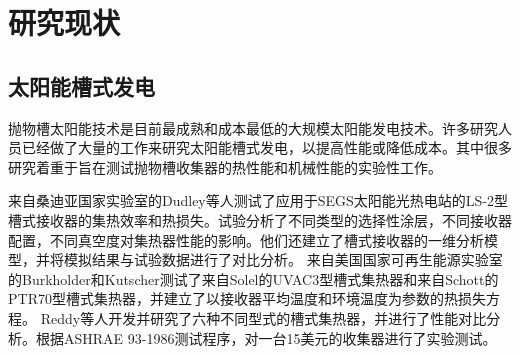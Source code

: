 \section{研究现状}

\subsection{太阳能槽式发电}

抛物槽太阳能技术是目前最成熟和成本最低的大规模太阳能发电技术\cite{Price2002}。许多研究人员已经做了大量的工作来研究太阳能槽式发电，以提高性能或降低成本。其中很多研究着重于旨在测试抛物槽收集器的热性能和机械性能的实验性工作。

来自桑迪亚国家实验室的Dudley等人\cite{Dudley1994}测试了应用于SEGS太阳能光热电站的LS-2型槽式接收器的集热效率和热损失。试验分析了不同类型的选择性涂层，不同接收器配置，不同真空度对集热器性能的影响。他们还建立了槽式接收器的一维分析模型，并将模拟结果与试验数据进行了对比分析。
来自美国国家可再生能源实验室的Burkholder和Kutscher\cite{Burkholder2009}测试了来自Solel的UVAC3型槽式集热器和来自Schott的PTR70型槽式集热器，并建立了以接收器平均温度和环境温度为参数的热损失方程。
Reddy等人开发并研究了六种不同型式的槽式集热器，并进行了性能对比分析。根据ASHRAE 93-1986测试程序，对一台15美元的收集器进行了实验测试。

